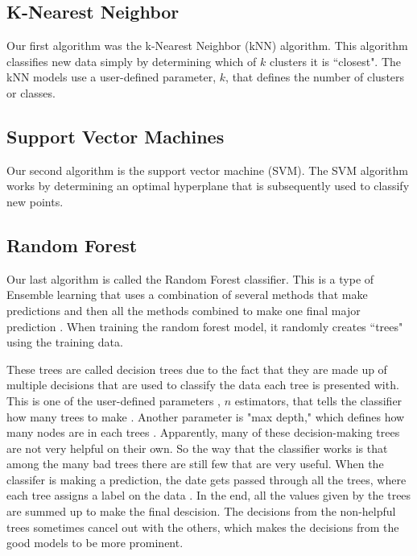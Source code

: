\documentclass[conference,compsoc]{IEEEtran}
\begin{document}
\subsection{K-Nearest Neighbor}
Our first algorithm was the k-Nearest Neighbor (kNN) algorithm.  This algorithm classifies new data simply by determining which of $k$ clusters it is ``closest".%
The kNN models use a user-defined parameter, $k$, that defines the number of clusters or classes. %

\subsection{Support Vector Machines}
Our second algorithm is the support vector machine (SVM).  The SVM algorithm works by determining an optimal hyperplane \cite{classsvm} that is subsequently used to classify new points. %

\subsection{Random Forest}
Our last algorithm is  called the Random Forest classifier.  This is a type of Ensemble learning that uses a combination of several methods that make predictions and then all the methods combined to make one final major prediction \cite{random}. When training the random forest model, it randomly creates ``trees" using the training data. 

These trees are called decision trees due to the fact that they are made up of multiple decisions that are used to classify the data each tree is presented with. This is one of the user-defined parameters , $n$ estimators, that tells the classifier how many trees to make \cite{scikit}. Another parameter is "max depth," which defines how many nodes are in each trees \cite{scikit}. Apparently, many of these decision-making trees are not very helpful on their own. So the way that the classifier works is that among the many bad trees there are still few that are very useful. When the classifer is making a prediction, the date gets passed through all the trees, where each tree assigns a label on the data \cite{random}. In the end, all the values given by the trees are summed up to make the final descision. The decisions from the non-helpful trees sometimes cancel out with the others, which makes the decisions from the good models to be more prominent.
\end{document}
